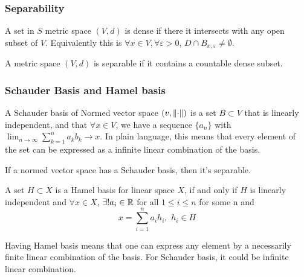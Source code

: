 \subsubsection{Separability}

\begin{definition}[dense]\nl
	A set in $S$ metric space $(V,d)$ is dense if there it intersects with any open subset of $V$. Equivalently this is $\forall x\in V,\forall \varepsilon>0$, $D\cap B_{x,\varepsilon}\neq \emptyset$.
\end{definition}


\begin{definition}[separable]\nl
	A metric space $(V,d)$ is separable if it contains a countable dense subset.
\end{definition}
\begin{comment}
\begin{example}[separable space example]\label{separable space example}
\end{example}
\end{comment}
\subsubsection{Schauder Basis and Hamel basis}

\begin{definition}\label{Schauder basis}\nl
	A Schauder basis of Normed vector space $(v,\left\|{\cdot}\right\|)$ is a set $B\subset V$ that is linearly independent, and that $\forall x\in V$, we have a sequence $\{a_n\}$ with $\lim_{n\to\infty}\sum_{k=1}^n a_k b_k\to x$. In plain language, this means that every element of the set can be expressed as a infinite linear combination of the basis.
\end{definition}


\begin{proposition}\rm\nextline
	If a normed vector space has a Schauder basis, then it's separable.
\end{proposition}

\begin{definition}\rm\nextline
	A set $H\subset X$ is a Hamel basis for linear space $X$, if and only if $H$ is linearly independent and $\forall x\in X$, $\exists !a_i\in \mathbb{R}$ for all $1\leq i\leq n$ for some n and
	$$
		x=\sum_{i=1}^n a_ih_i,\,\,h_i\in H
	$$
\end{definition}

\begin{remark}\rm\nextline
	Having Hamel basis means that one can express any element by a necessarily finite linear combination of the basis. For Schauder basis, it could be infinite linear combination.
\end{remark}

